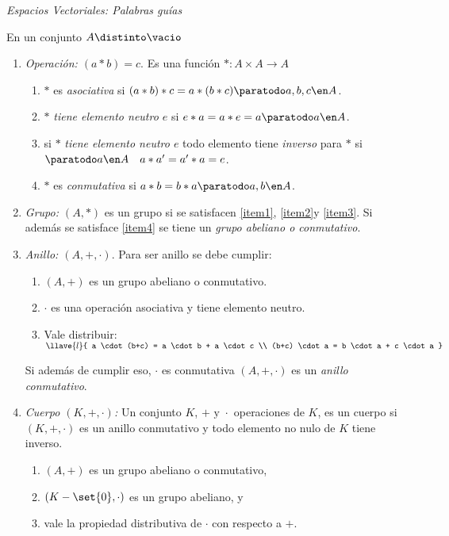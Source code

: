 \textit{Espacios Vectoriales: Palabras guías}

En un conjunto $A \distinto \vacio$
\begin{enumerate}[label=\tiny\purple{\faIcon{snowman}}]
  \item \textit{Operación: $(a * b) = c$}. Es una función $* : A \times A \to A$
        \begin{enumerate}[label=\roman*)]
          \item\label{item1} $*$ es \textit{asociativa} si $(a * b) * c = a * (b * c) \paratodo a, b, c \en A$.
          \item\label{item2} $*$ \textit{tiene elemento neutro $e$} si $e * a = a * e = a \paratodo a \en A$.
          \item\label{item3} si $*$ \textit{tiene elemento neutro $e$} todo elemento tiene \textit{inverso} para $*$
                si $\paratodo a \en A\quad a * a' = a' * a = e$.
          \item\label{item4} $*$ es \textit{conmutativa} si $a * b = b * a \paratodo a, b \en A$.
        \end{enumerate}

  \item \textit{Grupo: $(A, *)$} es un grupo si se satisfacen \ref{item1}, \ref{item2}y \ref{item3}. Si además se satisface \ref{item4}
        se tiene un \textit{grupo abeliano o conmutativo}.

  \item \textit{Anillo: $(A, +, \cdot)$}. Para ser anillo se debe cumplir:
        \begin{enumerate}[label=\roman*)]
          \item $(A, +)$ es un grupo abeliano o conmutativo.
          \item $\cdot$ es una operación asociativa y tiene elemento neutro.
          \item Vale distribuir:
                $
                  \llave{l}{
                    a \cdot (b+c) = a \cdot b + a \cdot c \\
                    (b+c) \cdot a = b \cdot a + c \cdot a
                  }
                $
        \end{enumerate}
        Si además de cumplir eso, $\cdot$ es conmutativa $(A, +, \cdot)$ es un \textit{anillo conmutativo}.

  \item \textit{Cuerpo $(K, + , \cdot)$:} Un conjunto $K$, $ + \text{ y } \cdot$ operaciones de $K$, es un cuerpo
        si $(K, +, \cdot)$ es un anillo conmutativo y todo elemento no nulo de $K$ tiene inverso.
        \begin{enumerate}[label=\roman*)]
          \item $(A, +) $ es un grupo abeliano o conmutativo,
          \item $(K - \set{0}, \cdot)$ es un grupo abeliano, y
          \item vale la propiedad distributiva de $\cdot$ con respecto a $+$.
        \end{enumerate}


\end{enumerate}
